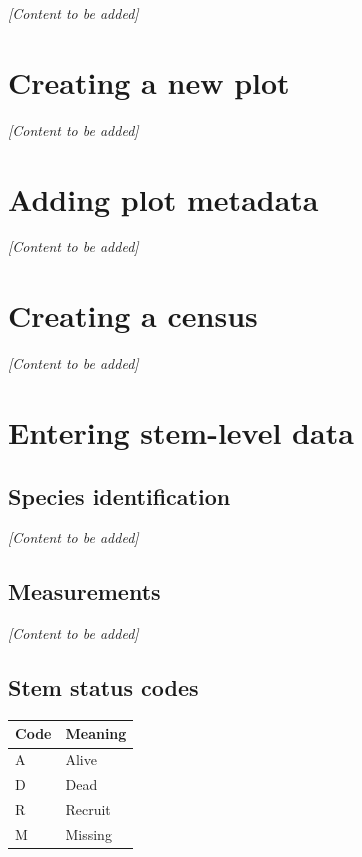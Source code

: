\documentclass[
]{book}
\newcounter{none} %
\begin{document}
\emph{{[}Content to be added{]}}

\section{Creating a new plot}\label{creating-a-new-plot}

\emph{{[}Content to be added{]}}

\section{Adding plot metadata}\label{adding-plot-metadata}

\emph{{[}Content to be added{]}}

\section{Creating a census}\label{creating-a-census}

\emph{{[}Content to be added{]}}

\section{Entering stem-level data}\label{entering-stem-level-data}

\subsection{Species identification}\label{species-identification}

\emph{{[}Content to be added{]}}

\subsection{Measurements}\label{measurements}

\emph{{[}Content to be added{]}}

\subsection{Stem status codes}\label{stem-status-codes}

{\def\LTcaptype{none} %
\begin{longtable}[]{@{}ll@{}}
\toprule\noalign{}
Code & Meaning \\
\midrule\noalign{}
\endhead
\bottomrule\noalign{}
\endlastfoot
A & Alive \\
D & Dead \\
R & Recruit \\
M & Missing \\
\end{longtable}
}
\end{document}
